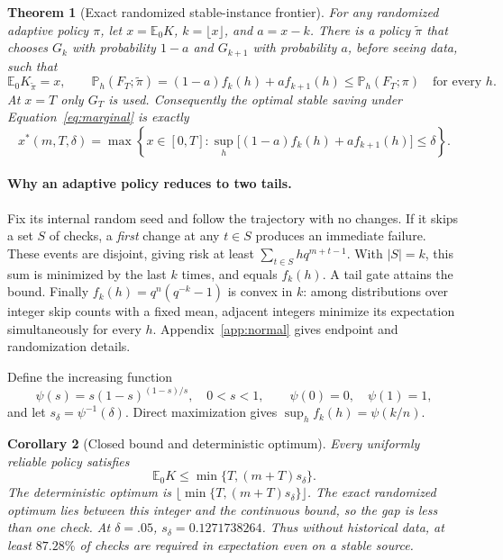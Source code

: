 \documentclass{article}
\newtheorem{theorem}{Theorem}
\newtheorem{corollary}[theorem]{Corollary}
\newcommand{\Pp}{\mathbb P}
\newcommand{\Ee}{\mathbb E}
\newcommand{\1}{\mathbf 1}
\begin{document}
\begin{theorem}[Exact randomized stable-instance frontier]\label{thm:normal}
For any randomized adaptive policy $\pi$, let $x=\Ee_0K$, $k=\lfloor x\rfloor$, and $a=x-k$. There is a policy $\widetilde\pi$ that chooses $G_k$ with probability $1-a$ and $G_{k+1}$ with probability $a$, before seeing data, such that
\begin{equation}
 \Ee_0K_{\widetilde\pi}=x,
 \qquad \Pp_h(F_T;\widetilde\pi)=(1-a)f_k(h)+af_{k+1}(h)\leq\Pp_h(F_T;\pi)
 \quad\text{for every }h.\label{eq:domination}
\end{equation}
At $x=T$ only $G_T$ is used. Consequently the optimal stable saving under Equation~\eqref{eq:marginal} is exactly
\begin{equation}
 x^*(m,T,\delta)=\max\left\{x\in[0,T]:\sup_h\big[(1-a)f_k(h)+af_{k+1}(h)\big]\leq\delta\right\}.\label{eq:frontier}
\end{equation}
\end{theorem}

\paragraph{Why an adaptive policy reduces to two tails.}
Fix its internal random seed and follow the trajectory with no changes. If it skips a set $S$ of checks, a \emph{first} change at any $t\in S$ produces an immediate failure. These events are disjoint, giving risk at least $\sum_{t\in S}h q^{m+t-1}$. With $|S|=k$, this sum is minimized by the last $k$ times, and equals $f_k(h)$. A tail gate attains the bound. Finally $f_k(h)=q^n(q^{-k}-1)$ is convex in $k$: among distributions over integer skip counts with a fixed mean, adjacent integers minimize its expectation simultaneously for every $h$. Appendix~\ref{app:normal} gives endpoint and randomization details.

Define the increasing function
\begin{equation}
\psi(s)=s(1-s)^{(1-s)/s},\quad 0<s<1,\qquad \psi(0)=0,\quad\psi(1)=1,
\end{equation}
and let $s_\delta=\psi^{-1}(\delta)$. Direct maximization gives $\sup_h f_k(h)=\psi(k/n)$.
\begin{corollary}[Closed bound and deterministic optimum]\label{cor:bound}
Every uniformly reliable policy satisfies
\begin{equation}
 \Ee_0 K\leq\min\{T,(m+T)s_\delta\}.\label{eq:continuous}
\end{equation}
The deterministic optimum is $\lfloor\min\{T,(m+T)s_\delta\}\rfloor$. The exact randomized optimum lies between this integer and the continuous bound, so the gap is less than one check. At $\delta=.05$, $s_\delta=0.1271738264$. Thus without historical data, at least $87.28\%$ of checks are required in expectation even on a stable source.
\end{corollary}
\end{document}
